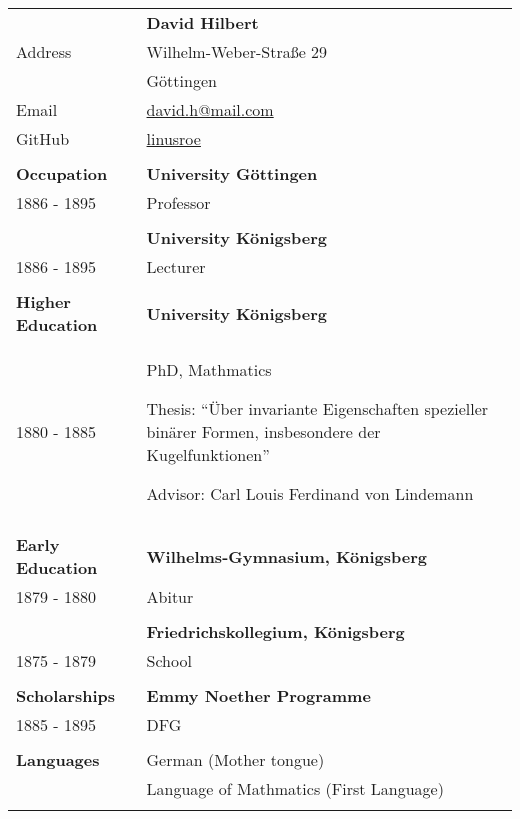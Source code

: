 \documentclass[12pt, a4paper]{article}
\newcommand{\putname}{David Hilbert}
\begin{document}
\begin{longtable}{@{} p{} >{\RaggedRight}p{}}
  \\
  & \textbf{\putname} \\
  Address
  & Wilhelm-Weber-Straße 29\\
  & 37075 G\"ottingen \\
  Email
  & \href{mailto:}{david.h@mail.com} \\
  GitHub
  & \href{https://github.com/linusroe}{linusroe} \\
  \\


  \textcolor{midblue}{\textbf{Occupation}}
  & \textbf{University Göttingen} \\
  1886 - 1895
  & Professor \\
  & \\

  & \textbf{University Königsberg} \\
  1886 - 1895
  & Lecturer \\
  & \\


  \textcolor{midblue}{\textbf{Higher Education}}
  & \textbf{University Königsberg} \\
  1880 - 1885
  & PhD, Mathmatics  

  Thesis: ``Über invariante Eigenschaften spezieller
  binärer Formen, insbesondere der Kugelfunktionen''

  Advisor: Carl Louis Ferdinand von Lindemann \\
  & \\


  \textcolor{midblue}{\textbf{Early Education}}
  & \textbf{Wilhelms-Gymnasium, Königsberg} \\
  1879 - 1880
  & Abitur \\
  & \\

  & \textbf{Friedrichskollegium, Königsberg} \\
  1875 - 1879 
  & School \\
  & \\


  \textcolor{midblue}{\textbf{Scholarships}}
  & \textbf{Emmy Noether Programme} \\
  1885 - 1895
  & DFG \\
  & \\


  \textcolor{midblue}{\textbf{Languages}}
  & German (Mother tongue) \\
  & Language of Mathmatics (First Language) \\
  & \\



\end{longtable}
\end{document}

